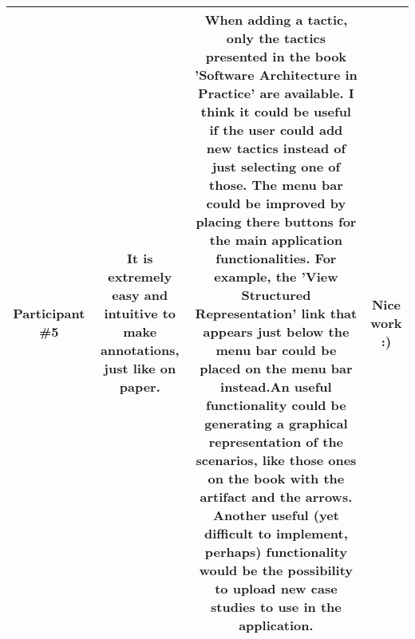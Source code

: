 \begin{table}[h]
\begin{tabular}{|c|c|c|c|}
Participant \#5 & \parbox[c][2cm]{2cm}{It is extremely easy and intuitive to make annotations, just like on paper.} & \parbox[c][6cm]{4cm}{When adding a tactic, only the tactics presented in the book 'Software Architecture in Practice' are available. I think it could be useful if the user could add new tactics instead of just selecting one of those. The menu bar could be improved by placing there buttons for the main application functionalities. For example, the 'View Structured Representation' link that appears just below the menu bar could be placed on the menu bar instead.An useful functionality could be generating a graphical representation of the scenarios, like those ones on the book with the artifact and the arrows. Another useful (yet difficult to implement, perhaps) functionality would be the possibility to upload new case studies to use in the application.} & Nice work :) \\  \hline		
\end{tabular}
\end{table}

